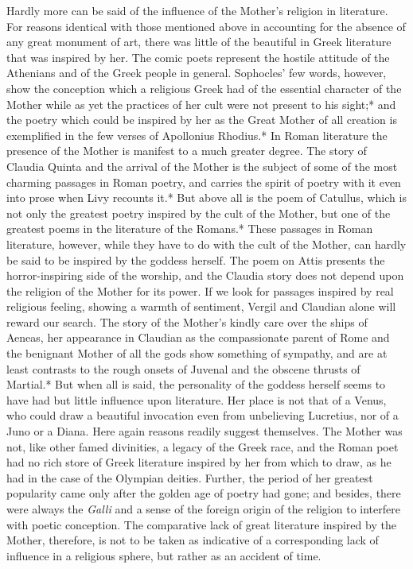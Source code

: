 \documentclass[a4paper, 11pt, oneside, polutonikogreek, english]{article}
\begin{document}
Hardly more can be said of the influence of the Mother's religion in literature. For reasons identical with those mentioned above in accounting for the absence of any great monument of art, there was little of the beautiful in Greek literature that was inspired by her. The comic poets represent the hostile attitude of the Athenians and of the Greek people in general. Sophocles' few words, however, show the conception which a religious Greek had of the essential character of the Mother while as yet the practices of her cult were not present to his sight;* and the poetry which could be inspired by her as the Great Mother of all creation is exemplified in the few verses of Apollonius Rhodius.* In Roman literature the presence of the Mother is manifest to a much greater degree. The story of Claudia Quinta and the arrival of the Mother is the subject of some of the most charming passages in Roman poetry, and carries the spirit of poetry with it even into prose when Livy recounts it.* But above all is the poem of Catullus, which is not only the greatest poetry inspired by the cult of the Mother, but one of the greatest poems in the literature of the Romans.* These passages in Roman literature, however, while they have to do with the cult of the Mother, can hardly be said to be inspired by the goddess herself. The poem on Attis presents the horror-inspiring side of the worship, and the Claudia story does not depend upon the religion of the Mother for its power. If we look for passages inspired by real religious feeling, showing a warmth of sentiment, Vergil and Claudian alone will reward our search. The story of the Mother's kindly care over the ships of Aeneas, her appearance in Claudian as the compassionate parent of Rome and the benignant Mother of all the gods show something of sympathy, and are at least contrasts to the rough onsets of Juvenal and the obscene thrusts of Martial.* But when all is said, the personality of the goddess herself seems to have had but little influence upon literature. Her place is not that of a Venus, who could draw a beautiful invocation even from unbelieving Lucretius, nor of a Juno or a Diana. Here again reasons readily suggest themselves. The Mother was not, like other famed divinities, a legacy of the Greek race, and the Roman poet had no rich store of Greek literature inspired by her from which to draw, as he had in the case of the Olympian deities. Further, the period of her greatest popularity came only after the golden age of poetry had gone; and besides, there were always the \emph{Galli} and a sense of the foreign origin of the religion to interfere with poetic conception. The comparative lack of great literature inspired by the Mother, therefore, is not to be taken as indicative of a corresponding lack of influence in a religious sphere, but rather as an accident of time.
\end{document}

